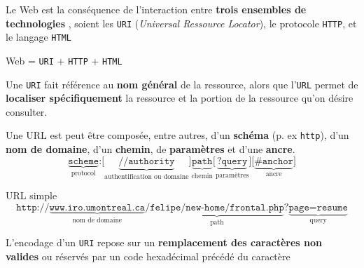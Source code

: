 \documentclass[a4paper]{report}
\begin{document}
    \begin{Concept}
        Le Web est la conséquence de l'interaction entre 
        \textbf{trois ensembles de technologies}  , soient les \texttt{URI} 
        (\textit{Universal Ressource Locator}), le protocole 
        \texttt{HTTP}, et le langage \texttt{HTML}    
        \begin{center}
            \selectfont Web = 
            \texttt{URI} + \texttt{HTTP} + \texttt{HTML}      
        \end{center}
    \end{Concept}

    Une \texttt{URI}  fait référence au \textbf{nom général}  de la ressource, alors 
    que l'\texttt{URL} permet de \textbf{localiser spécifiquement} la 
    ressource et la portion de la ressource qu'on désire consulter.

    \begin{Concept}
        Une URL est peut être composée, entre autres, 
        d'un \textbf{schéma} (p. ex \texttt{http}), 
        d'un \textbf{nom de domaine}, d'un \textbf{chemin}, de 
        \textbf{paramètres}  
        et d'une \textbf{ancre}.   
        \selectfont
        \[
        \underbrace{\texttt{scheme}}_{\text{protocol}}%
        \texttt{:}%
        \texttt{[}\underbrace{\texttt{//authority}}_{\text{authentification ou domaine}}\texttt{]}%
        \underbrace{\texttt{path}}_{\text{chemin}}%
        \texttt{[}\underbrace{\texttt{?query}}_{\text{paramètres}}\texttt{]}%
        \texttt{[}\underbrace{\texttt{\#anchor}}_{\text{ancre}}\texttt{]}
        \]
    \end{Concept}


    \selectfont\small
    \begin{EExample}{URL simple}{}
           \[
    \texttt{http://}\underbrace{\texttt{www.iro.umontreal.ca}}_{\text{nom de domaine}}%
    \texttt{/}\underbrace{\texttt{\~felipe/new-home/frontal.php}}_{\text{path}}%
    \texttt{?}\underbrace{\texttt{page=resume}}_{\text{query}}
    \]
    \end{EExample}


    \begin{Concept}
        L'encodage d'un \texttt{URI}  repose sur un 
        \textbf{remplacement des caractères 
        non valides}  
        ou réservés par un code hexadécimal précédé du caractère       
    \end{Concept}
 
\end{document}
